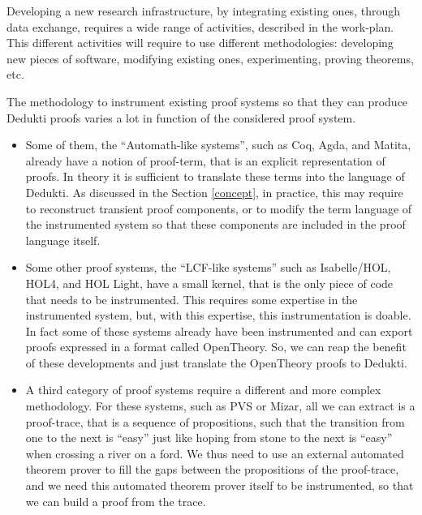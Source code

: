 Developing a new research infrastructure, by integrating existing
ones, through data exchange, requires a wide range of activities,
described in the work-plan. This different activities will require to
use different methodologies: developing new pieces of software,
modifying existing ones, experimenting, proving theorems, etc.


The methodology to instrument existing proof systems so that they can
produce Dedukti proofs varies a lot in function of the considered
proof system.

\begin{itemize}

\item 
Some of them, the ``Automath-like systems'', such as Coq, Agda, and
Matita, already have a notion of proof-term, that is an explicit
representation of proofs.  In theory it is sufficient to translate
these terms into the language of Dedukti.  As discussed in the Section
\ref{concept}, in practice, this may require to reconstruct transient
proof components, or to modify the term language of the instrumented
system so that these components are included in the proof language
itself.

\item
Some other proof systems, the ``LCF-like systems'' such as
Isabelle/HOL, HOL4, and HOL Light, have a small kernel, that is the
only piece of code that needs to be instrumented. This requires some
expertise in the instrumented system, but, with this expertise, this
instrumentation is doable. In fact some of these systems already have
been instrumented and can export proofs expressed in a format called
OpenTheory. So, we can reap the benefit of these developments and just
translate the OpenTheory proofs to Dedukti.

\item
A third category of proof systems require a different and more complex
methodology. For these systems, such as PVS or Mizar, all we can
extract is a proof-trace, that is a sequence of propositions, such
that the transition from one to the next is ``easy'' just like
hoping from stone to the next is ``easy'' when crossing a river on a
ford. We thus need to use an external automated theorem prover to fill
the gaps between the propositions of the proof-trace, and we need this
automated theorem prover itself to be instrumented, so that we can
build a proof from the trace.
\end{itemize}

